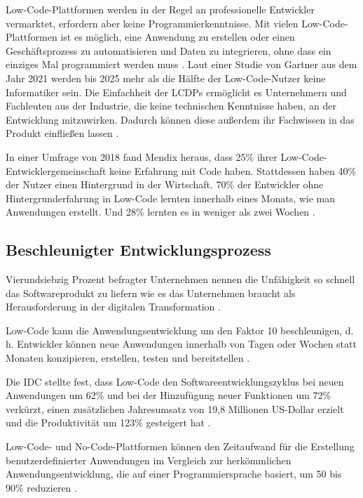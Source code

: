 \documentclass[12pt]{article} %
\begin{document}
	Low-Code-Plattformen werden in der Regel an professionelle Entwickler vermarktet, erfordern aber keine Programmierkenntnisse. Mit vielen Low-Code-Plattformen ist es möglich, eine Anwendung zu erstellen oder einen Geschäftsprozess zu automatisieren und Daten zu integrieren, ohne dass ein einziges Mal programmiert werden muss \cite{MichelleGardner.2022}. Laut einer Studie von Gartner aus dem Jahr 2021 werden bis 2025 mehr als die Hälfte der Low-Code-Nutzer keine Informatiker sein. Die Einfachheit der LCDPs ermöglicht es Unternehmern und Fachleuten aus der Industrie, die keine technischen Kenntnisse haben, an der Entwicklung mitzuwirken. Dadurch können diese außerdem ihr Fachwissen in das Produkt einfließen lassen \cite{OleksiiGlib.2022}.
	
	In einer Umfrage von 2018 fand Mendix heraus, dass 25\% ihrer Low-Code-Entwicklergemeinschaft keine Erfahrung mit Code haben. Stattdessen haben 40\% der Nutzer einen Hintergrund in der Wirtschaft. 70\% der Entwickler ohne Hintergrunderfahrung in Low-Code lernten innerhalb eines Monats, wie man Anwendungen erstellt. Und 28\% lernten es in weniger als zwei Wochen \cite{KevinShuler.2023}.
		
	
	\subsection{Beschleunigter Entwicklungsprozess}	\label{faster}
	Vierundsiebzig Prozent befragter Unternehmen nennen die Unfähigkeit so schnell das Softwareprodukt zu liefern wie es das Unternehmen braucht als Herausforderung in der digitalen Transformation \cite{EmmaVanPelt.2019}. \newline %
	
	Low-Code kann die Anwendungsentwicklung um den Faktor 10 beschleunigen, d. h. Entwickler können neue Anwendungen innerhalb von Tagen oder Wochen statt Monaten konzipieren, erstellen, testen und bereitstellen \cite{KevinShuler.2023}.
	
	Die IDC stellte fest, dass Low-Code den Softwareentwicklungszyklus bei neuen Anwendungen um 62\% und bei der Hinzufügung neuer Funktionen um 72\% verkürzt, einen zusätzlichen Jahresumsatz von 19,8 Millionen US-Dollar erzielt und die Produktivität um 123\% gesteigert hat \cite{KevinShuler.2023}.
	
	Low-Code- und No-Code-Plattformen können den Zeitaufwand für die Erstellung benutzerdefinierter Anwendungen im Vergleich zur herkömmlichen Anwendungsentwicklung, die auf einer Programmiersprache basiert, um 50 bis 90\% reduzieren \cite{KevinShuler.2023}.
		
\end{document}
